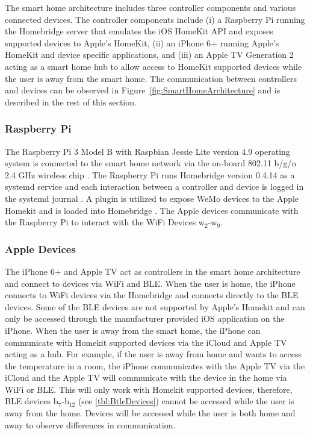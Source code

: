 The smart home architecture includes three controller components and various connected devices. The controller components include (i) a Raspberry Pi running the Homebridge server that emulates the iOS HomeKit API and exposes supported devices to Apple's HomeKit, (ii) an iPhone 6+ running Apple's HomeKit and device specific applications, and (iii) an Apple TV Generation 2 acting as a smart home hub to allow access to HomeKit supported devices while the user is away from the smart home. The communication between controllers and devices can be observed in Figure~\ref{fig:SmartHomeArchitecture} and is described in the rest of this section.

\figSmartHomeArchitecture

\subsubsection{Raspberry Pi}

The Raspberry Pi 3 Model B with Raspbian Jessie Lite version 4.9 operating system is connected to the smart home network via the on-board 802.11 b/g/n 2.4 GHz wireless chip \cite{rasbperry}. The Raspberry Pi runs Homebridge version 0.4.14 as a systemd service and each interaction between a controller and device is logged in the systemd journal \cite{homebridge}. A plugin is utilized to expose WeMo devices to the Apple Homekit and is loaded into Homebridge \cite{wemo}. The Apple devices communicate with the Raspberry Pi to interact with the WiFi Devices w$ _2 $-w$ _9 $.

\subsubsection{Apple Devices}

The iPhone 6+ and Apple TV act as controllers in the smart home architecture and connect to devices via WiFi and \ac{BLE}. When the user is home, the iPhone connects to WiFi devices via the Homebridge and connects directly to the \ac{BLE} devices. Some of the \ac{BLE} devices are not supported by Apple's Homekit and can only be accessed through the manufacturer provided iOS application on the iPhone. When the user is away from the smart home, the iPhone can communicate with Homekit supported devices via the iCloud and Apple TV acting as a hub. For example, if the user is away from home and wants to access the temperature in a room, the iPhone communicates with the Apple TV via the iCloud and the Apple TV will communicate with the device in the home via WiFi or \ac{BLE}. This will only work with Homekit supported devices, therefore, \ac{BLE} devices b$ _7 $-b$ _{12} $ (see \ref{tbl:BtleDevices}) cannot be accessed while the user is away from the home. Devices will be accessed while the user is both home and away to observe differences in communication.

